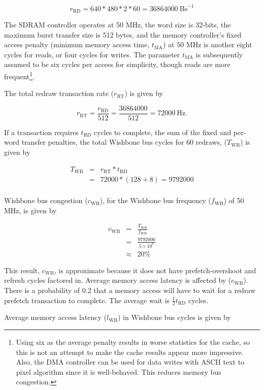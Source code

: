 \[
r_\mathrm{RD} = 640 * 480 * 2 * 60 = 36864000~\mathrm{Bs}^{-1}
\]

The SDRAM controller operates at 50 MHz, the word size is 32-bits, the maximum
burst transfer size is 512 bytes, and the memory controller's fixed access
penalty (minimum memory access time, $t_\mathrm{MA}$) at 50 MHz is another eight
cycles for reads, or four cycles for writes. The parameter $t_\mathrm{MA}$ is
subsequently assumed to be six cycles per access for simplicity, though reads are
more frequent\footnote{Using six as the average penalty results in worse
statistics for the cache, so this is not an attempt to make the cache results
appear more impressive. Also, the DMA controller can be used for data writes with
ASCII text to pixel algorithm since it is well-behaved. This reduces memory bus
congestion.}.

The total redraw transaction rate ($r_\mathrm{RT}$) is given by

\[
r_\mathrm{RT} = \frac{r_\mathrm{RD}}{512} = \frac{36864000}{512} =
72000~\mathrm{Hz}.
\]

If a transaction requires $t_\mathrm{RD}$ cycles to complete, the sum of the
fixed and per-word transfer penalties, the total Wishbone bus cycles for 60
redraws, ($T_\mathrm{WB}$) is given by

\begin{eqnarray*}
T_\mathrm{WB} & = & r_\mathrm{RT} * t_\mathrm{RD} \\
  & = & 72000 * (128 + 8) = 9792000 \\
\end{eqnarray*}

Wishbone bus congestion ($c_\mathrm{WB}$), for the Wishbone bus frequency
($f_\mathrm{WB}$) of 50 MHz, is given by

\begin{eqnarray*}
c_\mathrm{WB} & = & \frac{T_\mathrm{WB}}{f_\mathrm{WB}} \\
 & = & \frac{9792000}{5\times10^7} \\
 & \approx & 20\%
\end{eqnarray*}

This result, $c_\mathrm{WB}$, is approximate because it does not have
prefetch-overshoot and refresh cycles factored in. Average memory access latency
is affected by ($c_\mathrm{WB}$). There is a probability of 0.2 that a memory
access will have to wait for a redraw prefetch transaction to complete. The
average wait is $\frac{1}{2}t_\mathrm{RD}$ cycles.

Average memory access latency ($l_\mathrm{WB}$) in Wishbone bus cycles is given
by

